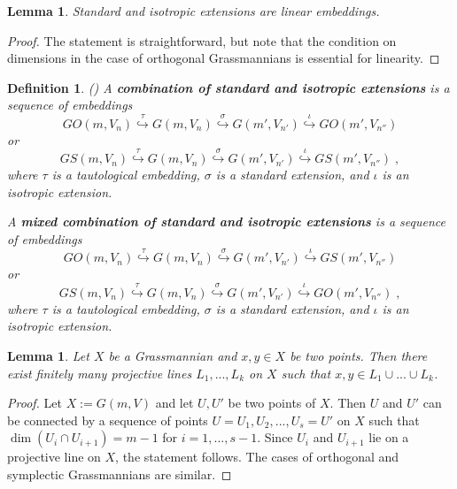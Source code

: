 \documentclass[12pt]{amsart}
\newtheorem{lemma}[theorem]{Lemma}
\newtheorem{definition}{Definition}[section]
\begin{document}
\begin{lemma}\label{Lemma Linearity of standard and isotropic ext}
Standard and isotropic extensions are linear embeddings.
\end{lemma}

\begin{proof}
The statement is straightforward, but note that the condition on dimensions in the case of orthogonal Grassmannians is essential for linearity.
\end{proof}

\begin{definition}\label{Def Combi Standard and Isotrop} {\rm (\cite{Penkov-Tikhomirov-Lin-ind-Grass})}
A {\bf combination of standard and isotropic extensions} is a sequence of embeddings
$$
GO(m,V_n) \stackrel{\tau}{\hookrightarrow} G(m,V_n) \stackrel{\sigma}{\hookrightarrow} G(m',V_{n'}) \stackrel{\iota}{\hookrightarrow} GO(m',V_{n''})
$$
or
$$
GS(m,V_n) \stackrel{\tau}{\hookrightarrow} G(m,V_n) \stackrel{\sigma}{\hookrightarrow} G(m',V_{n'}) \stackrel{\iota}{\hookrightarrow} GS(m',V_{n''}) \;,
$$
where $\tau$ is a tautological embedding, $\sigma$ is a standard extension, and $\iota$ is an isotropic extension.

A {\bf mixed combination of standard and isotropic extensions} is a sequence of embeddings
$$
GO(m,V_n) \stackrel{\tau}{\hookrightarrow} G(m,V_n) \stackrel{\sigma}{\hookrightarrow} G(m',V_{n'}) \stackrel{\iota}{\hookrightarrow} GS(m',V_{n''})
$$
or
$$
GS(m,V_n) \stackrel{\tau}{\hookrightarrow} G(m,V_n) \stackrel{\sigma}{\hookrightarrow} G(m',V_{n'}) \stackrel{\iota}{\hookrightarrow} GO(m',V_{n''}) \;,
$$
where $\tau$ is a tautological embedding, $\sigma$ is a standard extension, and $\iota$ is an isotropic extension.
\end{definition}

\begin{lemma}\label{Lemma Connect by lines}
Let $X$ be a Grassmannian and $x,y\in X$ be two points. Then there exist finitely many projective lines $L_1,...,L_k$ on $X$ such that $x,y\in L_1\cup...\cup L_k$.
\end{lemma}

\begin{proof} Let $X:=G(m,V)$ and let $U,U'$ be two points of $X$. Then $U$ and $U'$ can be connected by a sequence of points $U=U_1, U_2,...,U_s=U'$ on $X$ such that $\dim(U_i\cap U_{i+1})=m-1$ for $i=1,...,s-1$. Since $U_i$ and $U_{i+1}$ lie on a projective line on $X$, the statement follows. The cases of orthogonal and symplectic Grassmannians are similar.
\end{proof}
\end{document}
